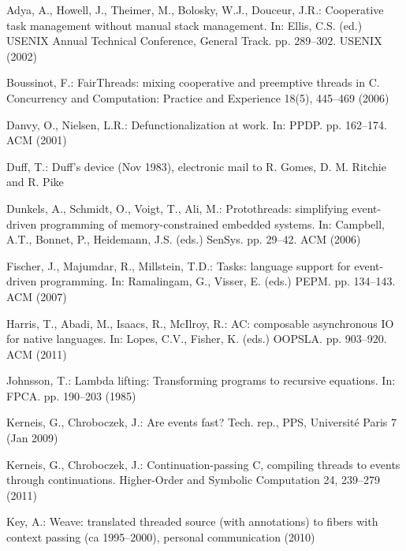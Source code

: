 \documentclass[a4paper]{llncs}
\begin{document}
\begin{thebibliography}{10}
\providecommand{\url}[1]{\texttt{#1}}
\providecommand{\urlprefix}{URL }

Adya, A., Howell, J., Theimer, M., Bolosky, W.J., Douceur, J.R.: Cooperative
  task management without manual stack management. In: Ellis, C.S. (ed.) USENIX
  Annual Technical Conference, General Track. pp. 289--302. USENIX (2002)

Boussinot, F.: {FairThreads}: mixing cooperative and preemptive threads in {C}.
  Concurrency and Computation: Practice and Experience  18(5),  445--469 (2006)

Danvy, O., Nielsen, L.R.: Defunctionalization at work. In: PPDP. pp. 162--174.
  ACM (2001)

Duff, T.: Duff's device (Nov 1983), electronic mail to {R}. {G}omes, {D}. {M}.
  {R}itchie and {R}. {P}ike

Dunkels, A., Schmidt, O., Voigt, T., Ali, M.: Protothreads: simplifying
  event-driven programming of memory-constrained embedded systems. In:
  Campbell, A.T., Bonnet, P., Heidemann, J.S. (eds.) SenSys. pp. 29--42. ACM
  (2006)

Fischer, J., Majumdar, R., Millstein, T.D.: Tasks: language support for
  event-driven programming. In: Ramalingam, G., Visser, E. (eds.) PEPM. pp.
  134--143. ACM (2007)

Harris, T., Abadi, M., Isaacs, R., McIlroy, R.: {AC}: composable asynchronous
  {IO} for native languages. In: Lopes, C.V., Fisher, K. (eds.) OOPSLA. pp.
  903--920. ACM (2011)

Johnsson, T.: Lambda lifting: Transforming programs to recursive equations. In:
  FPCA. pp. 190--203 (1985)

Kerneis, G., Chroboczek, J.: Are events fast? Tech. rep., {PPS,} Universit\'e
  Paris 7 (Jan 2009)

Kerneis, G., Chroboczek, J.: Continuation-passing {C}, compiling threads to
  events through continuations. Higher-Order and Symbolic Computation  24,
  239--279 (2011)

Key, A.: Weave: translated threaded source (with annotations) to fibers with
  context passing (ca 1995--2000), personal communication (2010)


\end{thebibliography}
\end{document}
